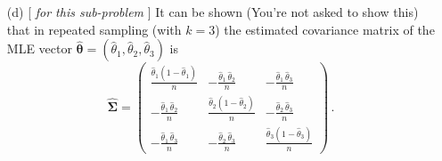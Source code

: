 \documentclass[12pt]{article}
\newenvironment{solution}{\begin{tcolorbox}[breakable]\begin{proof}[\textbf{\textit{Solution}}] }{\end{proof}\end{tcolorbox}}
\begin{document}
\begin{itemize}
\begin{itemize}
\begin{itemize}
\begin{solution}
\end{solution}
\vspace*{0.025in} (The result for general $k$, of course, is\footnote{To conform to the notational conventions in this course, I should write $\hat{ \bm{ \Theta } }_{ MLE } = ( \hat{ \Theta }_1, \dots, \hat{ \Theta }_k ) = \frac{ 1 }{ n } \bm{ N }$ instead of $\hat{ \bm{ \theta } }_{ MLE } = ( \hat{ \theta }_1, \dots \hat{ \theta }_k )$, using capital letters to denote random variables and lower-case letters to stand for their possible values, but the result in this problem gets quite ugly if I do so; I will also sometimes drop the subscript \textit{MLE} and just go, e.g., with $\hat{ \theta }_1$; please note and excuse these departures from otherwise common practice in this class.} that $\hat{ \bm{ \theta } }_{ MLE } = \frac{ 1 }{ n } \bm{ N }$. With $\gamma = ( \theta_1 - \theta_2 )$ defined as above, note that, by functional invariance of the MLE, $\hat{ \gamma }_{ MLE } = ( \hat{ \theta }_1 - \hat{ \theta }_2 )$.)

\end{itemize}
\item[(d)] [ \textit{\fbox{\textbf{10 total points}} \vspace*{0.025in} for this sub-problem} ] It can be shown (You're not asked to show this) that in repeated sampling (with $k = 3$) the estimated covariance matrix of the MLE vector $\hat{ \bm{ \theta } } = \left( \hat{ \theta }_1, \hat{ \theta }_2, \hat{ \theta }_3 \right)$ is 
\begin{equation} \label{e:multinomial-10}
\hat{ \bm{ \Sigma } } = \left( \begin{array}{ccc} \frac{ \hat{ \theta }_1 ( 1 - \hat{ \theta }_1 ) }{ n } & - \frac{ \hat{ \theta }_1 \, \hat{ \theta }_2 }{ n } & - \frac{ \hat{ \theta }_1 \, \hat{ \theta }_3 }{ n } \\ - \frac{ \hat{ \theta }_1 \, \hat{ \theta }_2 }{ n } & \frac{ \hat{ \theta }_2 ( 1 - \hat{ \theta }_2 ) }{ n } & - \frac{ \hat{ \theta }_2 \, \hat{ \theta }_3 }{ n } \\ - \frac{ \hat{ \theta }_1 \, \hat{ \theta }_3 }{ n } & - \frac{ \hat{ \theta }_2 \, \hat{ \theta }_3 }{ n } & \frac{ \hat{ \theta }_3 ( 1 - \hat{ \theta }_3 ) }{ n } \end{array} \right) \, .
\end{equation}

\begin{itemize}


\end{itemize}
\end{itemize}
\end{itemize}
\end{document}
